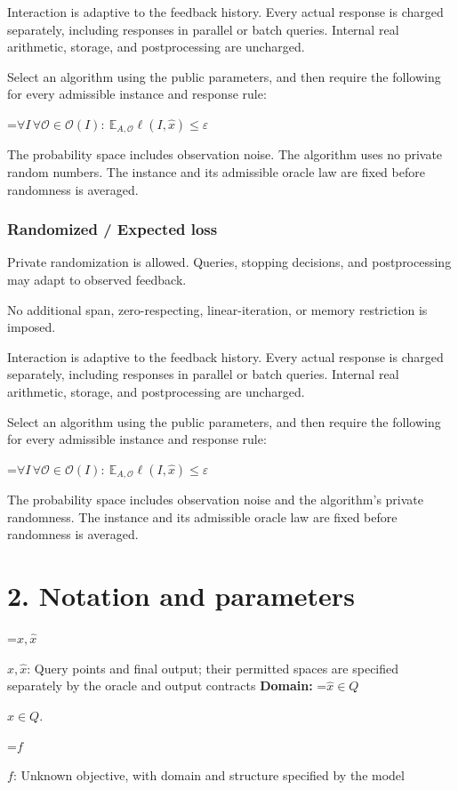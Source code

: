 \documentclass[10pt,a4paper]{article}
\newcommand{\AtlasMath}[1]{\par\begingroup\centering\setbox0=\hbox{$\displaystyle #1$}\ifdim\wd0>1.4\linewidth\typeout{ATLAS WIDE FORMULA: \the\wd0}\fi\ifdim\wd0>\linewidth\resizebox{\linewidth}{!}{\box0}\else\box0\fi\par\endgroup}
\newcommand{\AtlasInlineMath}[1]{\begingroup\setbox0=\hbox{$#1$}\ifdim\wd0>.4\linewidth\endgroup\AtlasMath{#1}\else\endgroup$#1$\fi}
\begin{document}
Interaction is adaptive to the feedback history. Every actual response is charged separately, including responses in parallel or batch queries. Internal real arithmetic, storage, and postprocessing are uncharged.

Select an algorithm using the public parameters, and then require the following for every admissible instance and response rule:


\AtlasMath{\forall I\,\forall\mathcal{O}\in\mathcal{O}(I):\ \mathbb{E}_{A,\mathcal{O}}\ell(I,\widehat{x})\le\varepsilon}


The probability space includes observation noise. The algorithm uses no private random numbers. The instance and its admissible oracle law are fixed before randomness is averaged.

\subsubsection{Randomized / Expected loss}
Private randomization is allowed. Queries, stopping decisions, and postprocessing may adapt to observed feedback.

No additional span, zero-respecting, linear-iteration, or memory restriction is imposed.

Interaction is adaptive to the feedback history. Every actual response is charged separately, including responses in parallel or batch queries. Internal real arithmetic, storage, and postprocessing are uncharged.

Select an algorithm using the public parameters, and then require the following for every admissible instance and response rule:


\AtlasMath{\forall I\,\forall\mathcal{O}\in\mathcal{O}(I):\ \mathbb{E}_{A,\mathcal{O}}\ell(I,\widehat{x})\le\varepsilon}


The probability space includes observation noise and the algorithm's private randomness. The instance and its admissible oracle law are fixed before randomness is averaged.

\section{2. Notation and parameters}
\AtlasInlineMath{x,\widehat{x}}: Query points and final output; their permitted spaces are specified separately by the oracle and output contracts \textbf{Domain:} \AtlasInlineMath{\widehat{x}\in Q}.

\AtlasInlineMath{f}: Unknown objective, with domain and structure specified by the model
\end{document}
